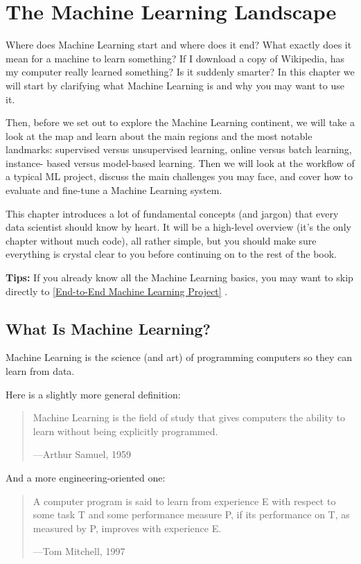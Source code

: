 \chapter{The Machine Learning Landscape\label{The Machine Learning Landscape}}
Where does Machine Learning start and where does it end? What exactly does it
mean for a machine to learn something? If I download a copy of Wikipedia, has my
computer really learned something? Is it suddenly smarter? In this chapter we will
start by clarifying what Machine Learning is and why you may want to use it.

Then, before we set out to explore the Machine Learning continent, we will take a
look at the map and learn about the main regions and the most notable landmarks:
supervised versus unsupervised learning, online versus batch learning, instance-
based versus model-based learning. Then we will look at the workflow of a typical ML
project, discuss the main challenges you may face, and cover how to evaluate and
fine-tune a Machine Learning system.

This chapter introduces a lot of fundamental concepts (and jargon) that every data
scientist should know by heart. It will be a high-level overview (it’s the only chapter
without much code), all rather simple, but you should make sure everything is crystal
clear to you before continuing on to the rest of the book.

\textbf{Tips:} If you already know all the Machine Learning basics, you may want
to skip directly to \autoref{End-to-End Machine Learning Project} .

\section{What Is Machine Learning?}
Machine Learning is the science (and art) of programming computers so they can
learn from data.

Here is a slightly more general definition:
\begin{quotation}
Machine Learning is the field of study that gives computers the ability to learn
without being explicitly programmed.
\begin{flushright}
---Arthur Samuel, 1959
\end{flushright}
\end{quotation}

And a more engineering-oriented one:
\begin{quotation}
A computer program is said to learn from experience E with respect to some task T
and some performance measure P, if its performance on T, as measured by P,
improves with experience E.
\begin{flushright}
---Tom Mitchell, 1997
\end{flushright}
\end{quotation}

